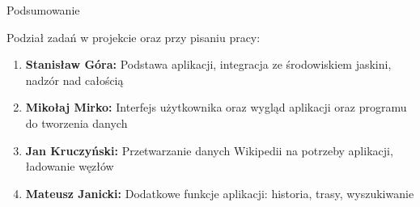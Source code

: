 \begin{chapter}{Podsumowanie}
	\newcommand{\chapterPath}{rozdzialy/7_podsumowanie}
	\label{ch:podsumowanie}
	
	\noindent Podział zadań w projekcie oraz przy pisaniu pracy:
	\begin{enumerate}[label=\textbullet]
		\item \textbf{Stanisław Góra:} Podstawa aplikacji, integracja ze środowiskiem jaskini, nadzór nad całością
		\item \textbf{Mikołaj Mirko:} Interfejs użytkownika oraz wygląd aplikacji oraz programu do tworzenia danych
		\item \textbf{Jan Kruczyński:} Przetwarzanie danych Wikipedii na potrzeby aplikacji, ładowanie węzłów
		\item \textbf{Mateusz Janicki:} Dodatkowe funkcje aplikacji: historia, trasy, wyszukiwanie
	\end{enumerate}
\end{chapter}
